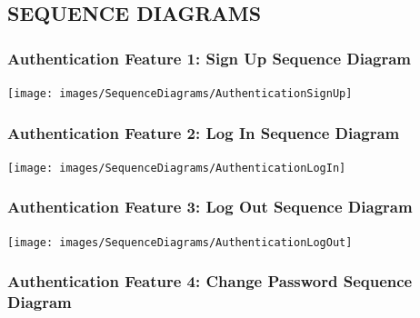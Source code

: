 \documentclass[twoside,letterpaper]{article}
\begin{document}
\subsection[SEQUENCE DIAGRAMS]{\rmfamily\bfseries SEQUENCE DIAGRAMS}


	\subsubsection[Authentication Feature 1: Sign Up Sequence Diagram]{\rmfamily\bfseries\color{black}
		Authentication Feature 1: Sign Up Sequence Diagram}
		\label{a:sd1}
	\hypertarget{RefHeading22059017292}{}
	
	\bigskip
	
	\texttt{[image: images/SequenceDiagrams/AuthenticationSignUp]}
	
	\newpage

	\subsubsection[Authentication Feature 2: Log In Sequence Diagram]{\rmfamily\bfseries\color{black}
		Authentication Feature 2: Log In Sequence Diagram}
	\hypertarget{RefHeading22059017292}{}
	
	\bigskip
	
	\texttt{[image: images/SequenceDiagrams/AuthenticationLogIn]}
	\label{a:sd2}
	\newpage
	
	
	\subsubsection[Authentication Feature 3: Log Out Sequence Diagram]{\rmfamily\bfseries\color{black}
		Authentication Feature 3: Log Out Sequence Diagram}
		\label{a:sd3}
	\hypertarget{RefHeading22059017292}{}
	
	\bigskip
	
	\texttt{[image: images/SequenceDiagrams/AuthenticationLogOut]}
	
	\newpage
	
	\subsubsection[Authentication Feature 4: Change Password Sequence Diagram]{\rmfamily\bfseries\color{black}
		Authentication Feature 4: Change Password Sequence Diagram}
	\hypertarget{RefHeading22059017292}{}
	\label{a:sd4}
	\bigskip
	
\end{document}
